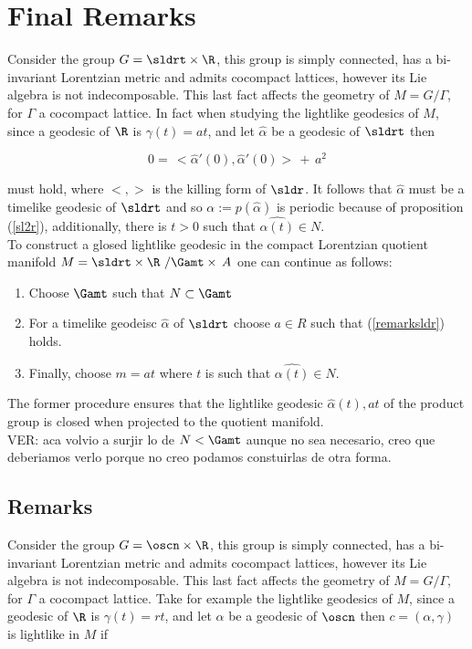 \documentclass[11pt]{amsart}
\theoremstyle{plain}
\theoremstyle{definition}
\theoremstyle{remark}
\begin{document}
\section{Final Remarks}
Consider the group $G=\sldrt \times \R$, this group is simply connected, has a bi-invariant Lorentzian metric and admits cocompact lattices, however its Lie algebra is not indecomposable. This last fact affects the geometry of $M=G/\Gamma$, for $\Gamma$ a cocompact lattice. In fact when studying the lightlike geodesics of $M$, since a geodesic of $\R$ is $\gamma(t)=a t$, and let $\hat{\alpha}$ be a geodesic of $\sldrt$ then

\begin{equation}\label{remarksldr}
0 = \, <\hat{\alpha}'(0),\hat{\alpha}'(0)> \, + \, a^2 
\end{equation}

must hold, where $<,>$ is the killing form of $\sldr$. It follows that $\hat{\alpha}$ must be a timelike geodesic of $\sldrt$ and so $\alpha := p(\hat{\alpha})$ is periodic because of proposition (\ref{sl2r}), additionally, there is $t>0$ such that $\hat{\alpha(t)}\in N$.\\

To construct a glosed lightlike geodesic in the compact Lorentzian quotient manifold $M=\sldrt \times \R \,\, / \Gamt \times \, A$  one can continue as follows:\\

\begin{enumerate}
    \item Choose $\Gamt$ such that $N \subset \Gamt$
    \item For a timelike geodeisc $\hat{\alpha}$ of $\sldrt$ choose $a \in R$ such that (\ref{remarksldr}) holds.
    \item Finally, choose $m=a t$ where $t$ is such that $\hat{\alpha(t)} \in N$.
\end{enumerate}

The former procedure ensures that the lightlike geodesic $\hat{\alpha}(t),at$ of the product group is closed when projected to the quotient manifold.\\

VER: aca volvio a surjir lo de $N < \Gamt$ aunque no sea necesario, creo que deberiamos verlo porque no creo podamos constuirlas de otra forma.





\subsection{Remarks}
Consider the group $G=\oscn \times \R$, this group is simply connected, has a bi-invariant Lorentzian metric and admits cocompact lattices, however its Lie algebra is not indecomposable. This last fact affects the geometry of $M=G/\Gamma$, for $\Gamma$ a cocompact lattice. Take for example the lightlike geodesics of $M$, since a geodesic of $\R$ is $\gamma(t)=r t$, and let $\alpha$ be a geodesic of $\oscn$ then $c=(\alpha,\gamma)$ is lightlike in $M$ if
\end{document}
